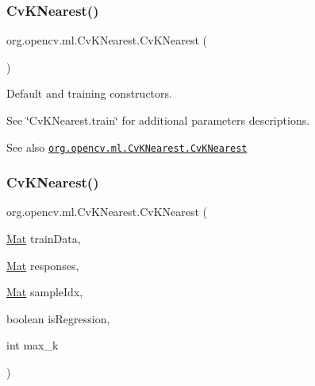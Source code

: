 \mbox{\label{classorg_1_1opencv_1_1ml_1_1_cv_k_nearest_af6d22d07534fa138fbf3c2279bbe8300}} 
\subsubsection{\texorpdfstring{Cv\+K\+Nearest()}{CvKNearest()}\hspace{0.1cm}{\footnotesize\ttfamily [2/4]}}
{\footnotesize\ttfamily org.\+opencv.\+ml.\+Cv\+K\+Nearest.\+Cv\+K\+Nearest (\begin{DoxyParamCaption}{ }\end{DoxyParamCaption})}

Default and training constructors.

See \char`\"{}\+Cv\+K\+Nearest.\+train\char`\"{} for additional parameters descriptions.

\begin{DoxySeeAlso}{See also}
\href{http://docs.opencv.org/modules/ml/doc/k_nearest_neighbors.html#cvknearest-cvknearest}{\tt org.\+opencv.\+ml.\+Cv\+K\+Nearest.\+Cv\+K\+Nearest} 
\end{DoxySeeAlso}
\mbox{\label{classorg_1_1opencv_1_1ml_1_1_cv_k_nearest_aaf56327cf25a554fcabadbd32b5e5622}} 
\subsubsection{\texorpdfstring{Cv\+K\+Nearest()}{CvKNearest()}\hspace{0.1cm}{\footnotesize\ttfamily [3/4]}}
{\footnotesize\ttfamily org.\+opencv.\+ml.\+Cv\+K\+Nearest.\+Cv\+K\+Nearest (\begin{DoxyParamCaption}\item[{\mbox{\hyperlink{classorg_1_1opencv_1_1core_1_1_mat}{Mat}}}]{train\+Data,  }\item[{\mbox{\hyperlink{classorg_1_1opencv_1_1core_1_1_mat}{Mat}}}]{responses,  }\item[{\mbox{\hyperlink{classorg_1_1opencv_1_1core_1_1_mat}{Mat}}}]{sample\+Idx,  }\item[{boolean}]{is\+Regression,  }\item[{int}]{max\+\_\+k }\end{DoxyParamCaption})}

